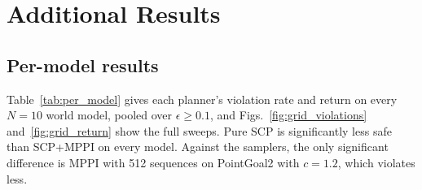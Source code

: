 \providecommand{\figdir}{../paper_graphs}

\section{Additional Results}\label{app:results}

\subsection{Per-model results}\label{app:per_model}

\begin{table}[htbp]
  \centering
  \caption{Table~\ref{tab:pooled} on the $c=1.2$ world models.}
  \label{tab:pooled_c1_2}
  \small
  
\end{table}

\begin{table}[htbp]
  \centering
  \caption{Table~\ref{tab:pooled} on the unbounded ($c=\infty$) world models.}
  \label{tab:pooled_cinf}
  \small
  
\end{table}

Table~\ref{tab:per_model} gives each planner's violation rate and return on every $N=10$ world model, pooled over
$\epsilon\ge0.1$, and Figs.~\ref{fig:grid_violations} and~\ref{fig:grid_return} show the full sweeps. Pure SCP is
significantly less safe than SCP+MPPI on every model. Against the samplers, the only significant difference is MPPI
with 512 sequences on PointGoal2 with $c=1.2$, which violates less.

\begin{table}[htbp]
  \centering
  \caption{Each planner on each $N=10$ world model, pooled over $\epsilon\ge0.1$: violation rate (Wilson) and return
  (bootstrap) with 95\% intervals, and McNemar's $p$ for SCP+MPPI against it on paired seeds, Holm-corrected over the
  six models.}
  \label{tab:per_model}
  \small
  
\end{table}

